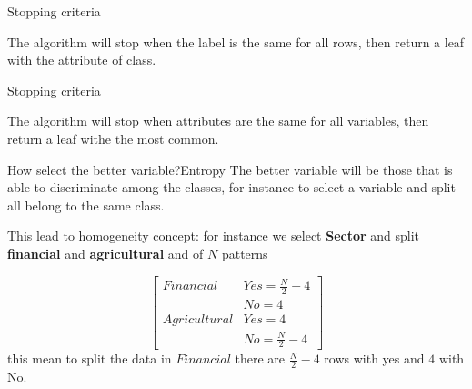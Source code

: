 \documentclass{beamer}
\begin{document}
\begin{frame}{Stopping criteria}
\begin{table}[]
\centering
{}
\caption{}
\label{tab:my-table}
\end{table}
The algorithm will stop when the label is the same for all rows, then return a leaf with the attribute of class.
\end{frame}



\begin{frame}{Stopping criteria}
\begin{table}[]
\centering
{}
\caption{}
\label{tab:my-table}
\end{table}
The algorithm will stop when attributes are the same for all variables, then return a leaf withe the most common.
\end{frame}


\begin{frame}{How select the better variable?}{Entropy}
The better variable will be those that is able to discriminate among the classes, for instance to select a variable and split all belong to the same class.

This lead to homogeneity concept:
for instance we select \textbf{Sector} and split \textbf{financial} and \textbf{agricultural} and of $N$ patterns

\[
\begin{bmatrix}
Financial &   Yes  = \frac{N}{2}-4 \\
		  &    No  = 4 \\
Agricultural & Yes = 4\\
             & No  = \frac{N}{2}-4
\end{bmatrix}
\]
this mean to split the data in $Financial$ there are $\frac{N}{2}-4$ rows with yes and $4$ with No.

\end{frame}
\end{document}
